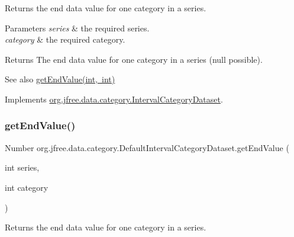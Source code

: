 Returns the end data value for one category in a series.


\begin{DoxyParams}{Parameters}
{\em series} & the required series. \\
\hline
{\em category} & the required category.\\
\hline
\end{DoxyParams}
\begin{DoxyReturn}{Returns}
The end data value for one category in a series (null possible).
\end{DoxyReturn}
\begin{DoxySeeAlso}{See also}
\mbox{\hyperlink{classorg_1_1jfree_1_1data_1_1category_1_1_default_interval_category_dataset_a4b514652a603f11d569d6797bd0bbe61}{get\+End\+Value(int, int)}} 
\end{DoxySeeAlso}


Implements \mbox{\hyperlink{interfaceorg_1_1jfree_1_1data_1_1category_1_1_interval_category_dataset_a2801c0f15eab2373ff828698f768a4b5}{org.\+jfree.\+data.\+category.\+Interval\+Category\+Dataset}}.

\mbox{\label{classorg_1_1jfree_1_1data_1_1category_1_1_default_interval_category_dataset_a4b514652a603f11d569d6797bd0bbe61}} 
\subsubsection{\texorpdfstring{get\+End\+Value()}{getEndValue()}\hspace{0.1cm}{\footnotesize\ttfamily [2/2]}}
{\footnotesize\ttfamily Number org.\+jfree.\+data.\+category.\+Default\+Interval\+Category\+Dataset.\+get\+End\+Value (\begin{DoxyParamCaption}\item[{int}]{series,  }\item[{int}]{category }\end{DoxyParamCaption})}

Returns the end data value for one category in a series.


